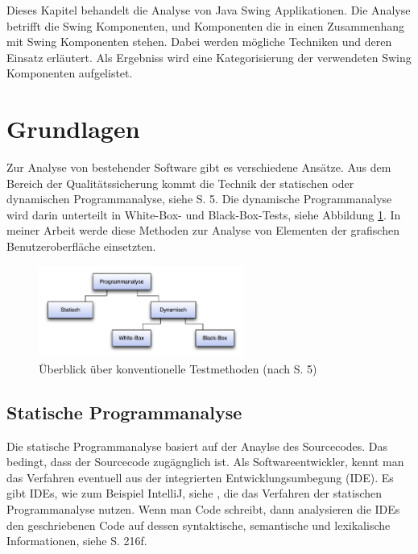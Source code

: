   Dieses Kapitel behandelt die Analyse von Java Swing Applikationen. Die
  Analyse betrifft die Swing Komponenten, und Komponenten die in einen
  Zusammenhang mit Swing Komponenten stehen. Dabei werden mögliche Techniken
  und deren Einsatz erläutert. Als Ergebniss wird eine Kategorisierung der
  verwendeten Swing Komponenten aufgelistet.
  
  \section{Grundlagen}
  
  Zur Analyse von bestehender Software gibt es verschiedene Ansätze. Aus dem
  Bereich der Qualitätssicherung kommt die Technik der statischen oder
  dynamischen Programmanalyse, siehe \cite{SoftwareanalyseBegriffeUndTechniken}
  S. 5. Die dynamische Programmanalyse wird darin unterteilt in White-Box-
  und Black-Box-Tests, siehe Abbildung \ref{img:programmanalyse}. In meiner
  Arbeit werde diese Methoden zur Analyse von Elementen der grafischen
  Benutzeroberfläche einsetzten.
  
  \begin{figure}[ht]
    \begin{center}
      \includegraphics[width=0.6\textwidth]{./image/programmanalyse.png}
      \caption{Überblick über konventionelle Testmethoden (nach
      \cite{SoftwareanalyseBegriffeUndTechniken} S. 5)}
      \label{img:programmanalyse}
    \end{center}
  \end{figure}
  
  \subsection{Statische Programmanalyse}

  Die statische Programmanalyse basiert auf der Anaylse des Sourcecodes. Das
  bedingt, dass der Sourcecode zugägnglich ist. Als Softwareentwickler, kennt
  man das Verfahren eventuell aus der integrierten Entwicklungsumbegung
  (\acs{IDE}). Es gibt \acp{IDE}, wie zum Beispiel IntelliJ, siehe
  \cite{StaticCodeAnalysisIntelliJ}, die das Verfahren der statischen
  Programmanalyse nutzen. Wenn man Code schreibt, dann analysieren die
  \acp{IDE} den geschriebenen Code auf dessen syntaktische, semantische und
  lexikalische Informationen, siehe
  \cite{SoftwareQualitaetsmanagementInDerPraxis} S. 216f.
  
